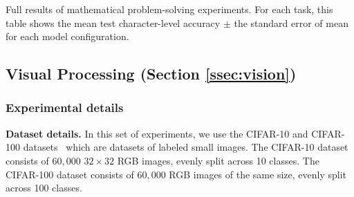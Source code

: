 \begin{table}
    \resizebox{\textwidth}{!}{%
    
    }
    \vskip 10pt
    \caption{Full results of mathematical problem-solving experiments. For each task, this table shows the mean test character-level accuracy $\pm$ the standard error of mean for each model configuration.}\label{tab:math_full_results}
\end{table}






\subsection{Visual Processing (Section \ref{ssec:vision})}\label{ssec:appendix_vision}

\subsubsection*{Experimental details}

\textbf{Dataset details.} In this set of experiments, we use the CIFAR-10 and CIFAR-100 datasets~\citep{cifar_dataset} which are datasets of labeled small images. The CIFAR-10 dataset consists of $60,000$ $32 \times 32$ RGB images, evenly split across 10 classes. The CIFAR-100 dataset consists of $60,000$ RGB images of the same size, evenly split across 100 classes.

